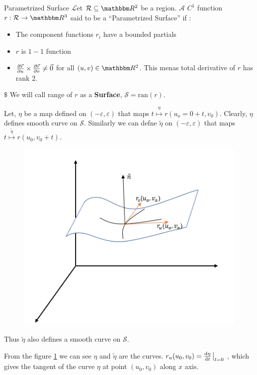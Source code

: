 \documentclass[../Analysis-3]{subfiles}
\begin{document}
\begin{Def}{Parametrized Surface}{}\label{def:ps}
    $\mathcal{L}$et $\mathcal{R} \subseteq \R^2$ be a region. $\mathcal{A}$ $C^1$ function $r:\mathcal{R} \to \R^3$ said to be a \enquote{Parametrized Surface} if :
    \begin{itemize}
        \item The component functions $r_i$ have a bounded partials
        \item $r$ is $1-1$ function
        \item $\pdv{\vec{r}}{u} \times \pdv{\vec{r}}{v} \neq \vec{0}$ for all $(u,v) \in \R^2$. This menas total derivative of $r$ has rank $2$.
    \end{itemize}
    $\$$ We will call range of $r$ as a \textbf{Surface}, $ \mathcal{S} = \text{ran}(r)$.
\end{Def}

Let, $\eta$ be a map defined on $(-\varepsilon,\varepsilon)$ that maps $t \overset{\eta}{\mapsto} r(u_o=0 + t,v_0)$. Clearly, $\eta$ defines smooth curve on $\mathcal{S}$. Similarly we can defne $\tilde{\eta}$ on $(-\varepsilon,\varepsilon)$ that maps $t \overset{\tilde{\eta}}{\mapsto} r(u_0,v_0+t)$.

\begin{figure}
    \centering
    \includegraphics[width=.78\linewidth]{../figures/lec-24.2.png}
    \caption{\label{fig24:1}}
\end{figure}


Thus $\tilde{\eta}$ also defines a smooth curve on $\mathcal{S}$.

\vspace{0.2cm}

From the figure \ref{fig24:1} we can see $\eta$ and $\tilde{\eta}$ are the curves. $r_u(u_0,v_0)=\dv{\eta}{t}\eval_{t=0}$ , which gives the tangent of the curve $\eta$ at point $(u_0,v_0)$ along $x$ axis.
\end{document}
